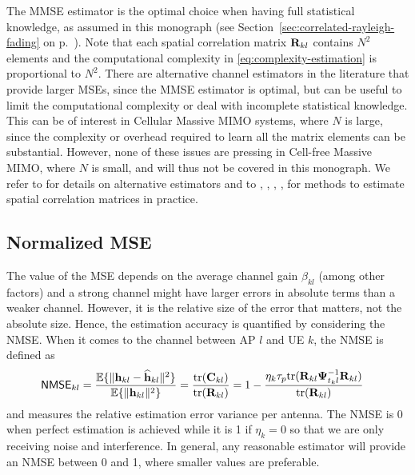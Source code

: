 \begin{remark}
The MMSE estimator is the optimal choice when having full statistical knowledge, as assumed in this monograph (see Section~\ref{sec:correlated-rayleigh-fading} on p.~\pageref{sec:correlated-rayleigh-fading}). Note that each spatial correlation matrix $\mathbf{R}_{kl}$ contains $N^2$ elements and the computational complexity in \eqref{eq:complexity-estimation} is proportional to $N^2$. 
There are alternative channel estimators in the literature that provide larger MSEs, since the MMSE estimator is optimal, but can be useful to limit the computational complexity or deal with incomplete statistical knowledge.
This can be of interest in Cellular Massive MIMO systems, where $N$ is large, since the complexity or overhead required to learn all the matrix elements can be substantial. However, none of these issues are pressing in Cell-free Massive MIMO, where $N$ is small, and will thus not be covered in this monograph.
We refer to \cite[Sec.~3.4]{massivemimobook} for details on alternative estimators and to \cite{BSD16A}, \cite{CaireC17a}, \cite{NeumannJU17}, \cite{Sanguinetti2019a}, \cite{UpadhyaJU17} for methods to estimate spatial correlation matrices in practice.
\end{remark}




\subsection{Normalized MSE}

The value of the MSE depends on the average channel gain $ \beta_{kl} $ (among other factors) and a strong channel might have larger errors in absolute terms than a weaker channel. However, it is the relative size of the error that matters, not the absolute size.
Hence, the estimation accuracy is quantified by considering the \gls{NMSE}. When it comes to the channel between AP $l$ and UE $k$, the \gls{NMSE} is defined as
\begin{align}
\mathsf{NMSE}_{kl}=\frac{\mathbb{E}\{ \| \mathbf{h}_{kl} - \widehat{\mathbf{h}}_{kl} \|^2 \}}{ \mathbb{E}\{ \| \mathbf{h}_{kl}\|^2 \}} &= \frac{\mathrm{tr}( \mathbf{C}_{kl}  )}{ \mathrm{tr}( \mathbf{R}_{kl}  )} =1 - \frac{\eta_k \tau_p  \mathrm{tr}(\mathbf{R}_{kl} \mathbf{\Psi}_{t_kl}^{-1} \mathbf{R}_{kl}) }{ \mathrm{tr}( \mathbf{R}_{kl}  )} \label{eq:nmse-correlated-AP-l}
\end{align}
and measures the relative estimation error variance per
antenna.  The \gls{NMSE} is 0 when perfect estimation is achieved while it is 1 if $\eta_k=0$ so that we are only receiving noise and interference.
In general, any reasonable estimator will provide an \gls{NMSE} between 0 and 1, where smaller values are preferable.

